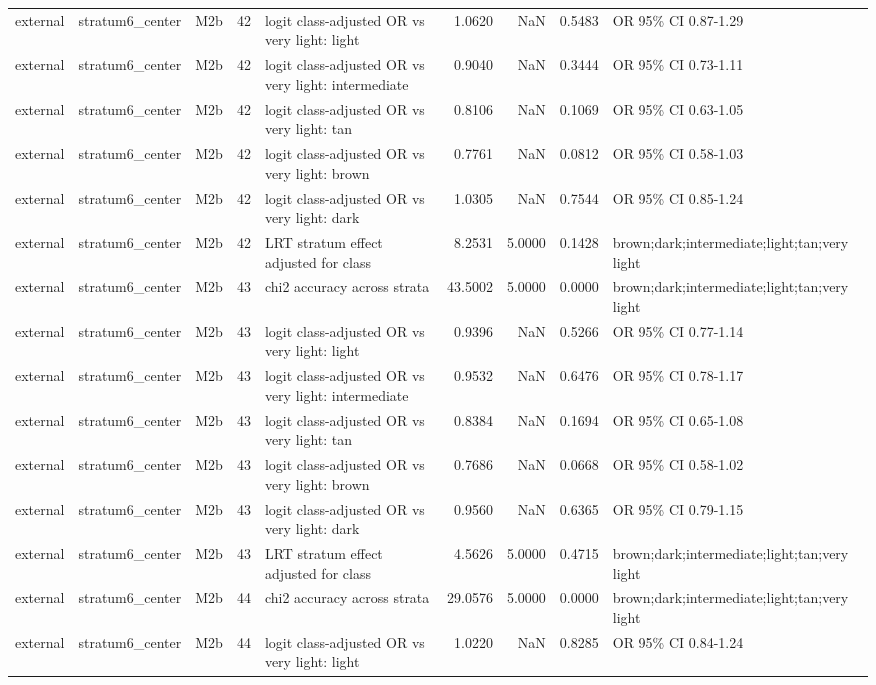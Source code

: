 \begin{tabular}{lllrlrrrl}
external & stratum6\_center & M2b & 42 & logit class-adjusted OR vs very light: light & 1.0620 & NaN & 0.5483 & OR 95\% CI 0.87-1.29 \\
external & stratum6\_center & M2b & 42 & logit class-adjusted OR vs very light: intermediate & 0.9040 & NaN & 0.3444 & OR 95\% CI 0.73-1.11 \\
external & stratum6\_center & M2b & 42 & logit class-adjusted OR vs very light: tan & 0.8106 & NaN & 0.1069 & OR 95\% CI 0.63-1.05 \\
external & stratum6\_center & M2b & 42 & logit class-adjusted OR vs very light: brown & 0.7761 & NaN & 0.0812 & OR 95\% CI 0.58-1.03 \\
external & stratum6\_center & M2b & 42 & logit class-adjusted OR vs very light: dark & 1.0305 & NaN & 0.7544 & OR 95\% CI 0.85-1.24 \\
external & stratum6\_center & M2b & 42 & LRT stratum effect adjusted for class & 8.2531 & 5.0000 & 0.1428 & brown;dark;intermediate;light;tan;very light \\
external & stratum6\_center & M2b & 43 & chi2 accuracy across strata & 43.5002 & 5.0000 & 0.0000 & brown;dark;intermediate;light;tan;very light \\
external & stratum6\_center & M2b & 43 & logit class-adjusted OR vs very light: light & 0.9396 & NaN & 0.5266 & OR 95\% CI 0.77-1.14 \\
external & stratum6\_center & M2b & 43 & logit class-adjusted OR vs very light: intermediate & 0.9532 & NaN & 0.6476 & OR 95\% CI 0.78-1.17 \\
external & stratum6\_center & M2b & 43 & logit class-adjusted OR vs very light: tan & 0.8384 & NaN & 0.1694 & OR 95\% CI 0.65-1.08 \\
external & stratum6\_center & M2b & 43 & logit class-adjusted OR vs very light: brown & 0.7686 & NaN & 0.0668 & OR 95\% CI 0.58-1.02 \\
external & stratum6\_center & M2b & 43 & logit class-adjusted OR vs very light: dark & 0.9560 & NaN & 0.6365 & OR 95\% CI 0.79-1.15 \\
external & stratum6\_center & M2b & 43 & LRT stratum effect adjusted for class & 4.5626 & 5.0000 & 0.4715 & brown;dark;intermediate;light;tan;very light \\
external & stratum6\_center & M2b & 44 & chi2 accuracy across strata & 29.0576 & 5.0000 & 0.0000 & brown;dark;intermediate;light;tan;very light \\
external & stratum6\_center & M2b & 44 & logit class-adjusted OR vs very light: light & 1.0220 & NaN & 0.8285 & OR 95\% CI 0.84-1.24 \\

\end{tabular}
